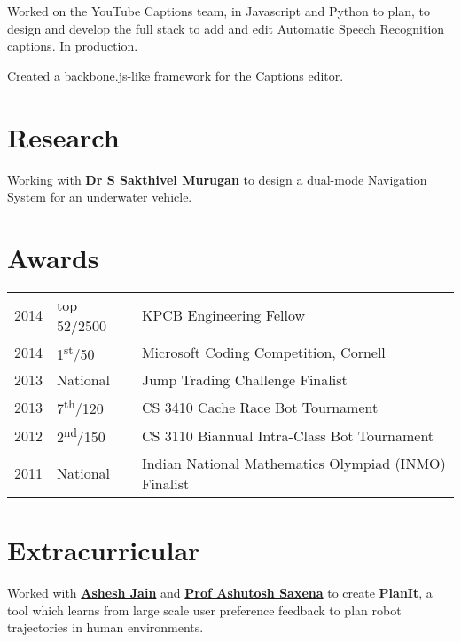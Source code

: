\documentclass[]{deedy-resume-openfont}
\begin{document}
\begin{minipage}[t]{0.64\textwidth}
\begin{tightemize}
\item Worked on the YouTube Captions team, in Javascript and Python to plan, to design and develop the full stack to add and edit Automatic Speech Recognition captions. In production.
\item Created a backbone.js-like framework for the Captions editor.
\end{tightemize}
\sectionsep


\section{Research}
Working with \textbf{\href{https://sites.google.com/view/uwarlssn}{Dr S Sakthivel Murugan}} to design a dual-mode Navigation System for an underwater vehicle.  
\sectionsep


\section{Awards} 
\begin{tabular}{rll}
2014	     & top 52/2500  & KPCB Engineering Fellow\\
2014	     & 1\textsuperscript{st}/50  & Microsoft Coding Competition, Cornell\\
2013	     & National  & Jump Trading Challenge Finalist\\
2013     & 7\textsuperscript{th}/120 & CS 3410 Cache Race Bot Tournament  \\
2012     & 2\textsuperscript{nd}/150 & CS 3110 Biannual Intra-Class Bot Tournament \\
2011     & National & Indian National Mathematics Olympiad (INMO) Finalist \\
\end{tabular}
\sectionsep


\section{Extracurricular}
Worked with \textbf{\href{http://www.cs.cornell.edu/~ashesh/}{Ashesh Jain}} and \textbf{\href{http://www.cs.cornell.edu/~asaxena/}{Prof Ashutosh Saxena}} to create \textbf{PlanIt}, a tool which  learns from large scale user preference feedback to plan robot trajectories in human environments.  
\sectionsep

\end{minipage} 
\end{document}
